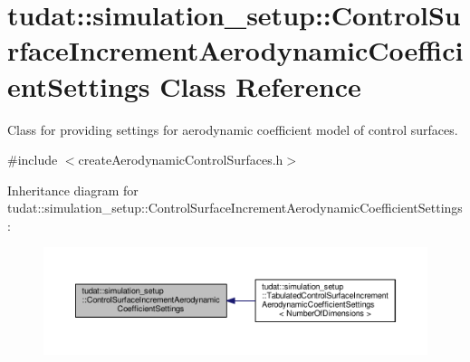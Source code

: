 \hypertarget{classtudat_1_1simulation__setup_1_1ControlSurfaceIncrementAerodynamicCoefficientSettings}{}\section{tudat\+:\+:simulation\+\_\+setup\+:\+:Control\+Surface\+Increment\+Aerodynamic\+Coefficient\+Settings Class Reference}
\label{classtudat_1_1simulation__setup_1_1ControlSurfaceIncrementAerodynamicCoefficientSettings}


Class for providing settings for aerodynamic coefficient model of control surfaces.  




{\ttfamily \#include $<$create\+Aerodynamic\+Control\+Surfaces.\+h$>$}



Inheritance diagram for tudat\+:\+:simulation\+\_\+setup\+:\+:Control\+Surface\+Increment\+Aerodynamic\+Coefficient\+Settings\+:
\nopagebreak
\begin{figure}[H]
\begin{center}
\leavevmode
\includegraphics[width=350pt]{classtudat_1_1simulation__setup_1_1ControlSurfaceIncrementAerodynamicCoefficientSettings__inherit__graph}
\end{center}
\end{figure}

